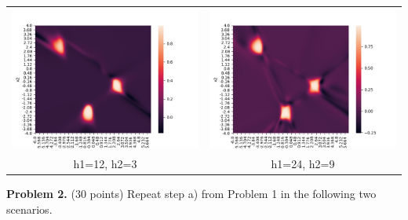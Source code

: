 \documentclass[twoside]{article}
\begin{document}
\begin{tabular}{ cc }
	\includegraphics[scale=0.5]{heatmaps1/B1c_12_3} & \includegraphics[scale=0.5]{heatmaps1/B1c_24_9} \\ 
	h1=12, h2=3 & h1=24, h2=9 \\ 
\end{tabular}


\pagebreak


\textbf{Problem 2.} (30 points) Repeat step a) from Problem 1 in the following two scenarios.
\end{document}
